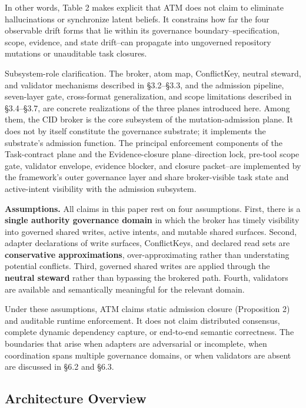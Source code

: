 \documentclass[9pt,letterpaper]{extarticle}
\begin{document}
In other words, Table 2 makes explicit that ATM does not claim to eliminate hallucinations or synchronize latent beliefs. It constrains how far the four observable drift forms that lie within its governance boundary--specification, scope, evidence, and state drift--can propagate into ungoverned repository mutations or unauditable task closures.

Subsystem-role clarification. The broker, atom map, ConflictKey, neutral steward, and validator mechanisms described in §3.2--§3.3, and the admission pipeline, seven-layer gate, cross-format generalization, and scope limitations described in §3.4--§3.7, are concrete realizations of the three planes introduced here. Among them, the CID broker is the core subsystem of the mutation-admission plane. It does not by itself constitute the governance substrate; it implements the substrate's admission function. The principal enforcement components of the Task-contract plane and the Evidence-closure plane--direction lock, pre-tool scope gate, validator envelope, evidence blocker, and closure packet--are implemented by the framework's outer governance layer and share broker-visible task state and active-intent visibility with the admission subsystem.

\textbf{Assumptions.} All claims in this paper rest on four assumptions. First, there is a \textbf{single authority governance domain} in which the broker has timely visibility into governed shared writes, active intents, and mutable shared surfaces. Second, adapter declarations of write surfaces, ConflictKeys, and declared read sets are \textbf{conservative approximations}, over-approximating rather than understating potential conflicts. Third, governed shared writes are applied through the \textbf{neutral steward} rather than bypassing the brokered path. Fourth, validators are available and semantically meaningful for the relevant domain.

Under these assumptions, ATM claims static admission closure (Proposition 2) and auditable runtime enforcement. It does not claim distributed consensus, complete dynamic dependency capture, or end-to-end semantic correctness. The boundaries that arise when adapters are adversarial or incomplete, when coordination spans multiple governance domains, or when validators are absent are discussed in §6.2 and §6.3.

\subsection{Architecture Overview}
\end{document}
